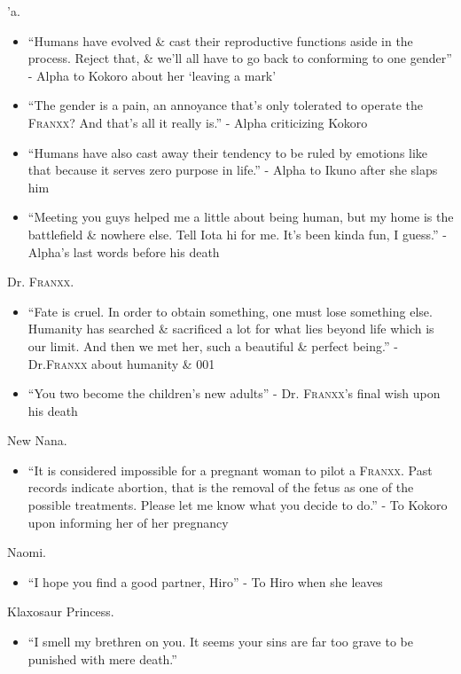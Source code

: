\documentclass{article}
\begin{document}
\begin{enumerate}
\begin{itemize}
    \end{itemize}
    {'a.}
    \begin{itemize}
    	\item ``Humans have evolved \& cast their reproductive functions aside in the process. Reject that, \& we'll all have to go back to conforming to one gender'' - Alpha to Kokoro about her `leaving a mark'
    	\item ``The gender is a pain, an annoyance that's only tolerated to operate the \textsc{Franxx}? And that's all it really is.'' - Alpha criticizing Kokoro
    	\item ``Humans have also cast away their tendency to be ruled by emotions like that because it serves zero purpose in life.'' - Alpha to Ikuno after she slaps him
    	\item ``Meeting you guys helped me a little about being human, but my home is the battlefield \& nowhere else. Tell Iota hi for me. It's been kinda fun, I guess.'' - Alpha's last words before his death
    \end{itemize}
    {\sc Dr. \textsc{Franxx}.}
    \begin{itemize}
    	\item ``Fate is cruel. In order to obtain something, one must lose something else. Humanity has searched \& sacrificed a lot for what lies beyond life which is our limit. And then we met her, such a beautiful \& perfect being.'' - Dr.\textsc{Franxx} about humanity \& 001
    	\item ``You two become the children's new adults'' - Dr. \textsc{Franxx}'s final wish upon his death
    \end{itemize}
    {\sc New Nana.}
    \begin{itemize}
    	\item ``It is considered impossible for a pregnant woman to pilot a \textsc{Franxx}. Past records indicate abortion, that is the removal of the fetus as one of the possible treatments. Please let me know what you decide to do.'' - To Kokoro upon informing her of her pregnancy
    \end{itemize}
    {\sc Naomi.}
    \begin{itemize}
    	\item ``I hope you find a good partner, Hiro'' - To Hiro when she leaves
    \end{itemize}
    {\sc Klaxosaur Princess.}
    \begin{itemize}
    	\item ``I smell my brethren on you. It seems your sins are far too grave to be punished with mere death.''

\end{itemize}
\end{enumerate}
\end{document}
